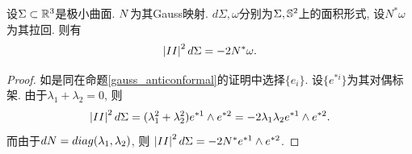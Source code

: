 \begin{proposition}
    设$\Sigma \subset \R^3$是极小曲面. $\N$为其Gauss映射. $d\Sigma, \omega$分别为$\Sigma, \S^2$上的面积形式, 设$N^*\omega$为其拉回. 则有
    \begin{equation}
        \abs{II}^2d\Sigma= -2N^*\omega.
    \end{equation}
\end{proposition}
\begin{proof}
    如是同在命题\eqref{gauss_anticonformal}的证明中选择$\{e_i\}$. 设$\{e^{*i}\}$为其对偶标架. 由于$\lambda_1+\lambda_2=0$, 则
    \begin{equation}
        \abs{II}^2d\Sigma=(\lambda_1^2+\lambda_2^2)e^{*1}\wedge e^{*2}=-2\lambda_1\lambda_2 e^{*1}\wedge e^{*2}.
    \end{equation}
    而由于$d\N=diag(\lambda_1,\lambda_2)$, 则 $\abs{II}^2d\Sigma=-2N^* e^{*1} \wedge e^{*2}$.
\end{proof}
